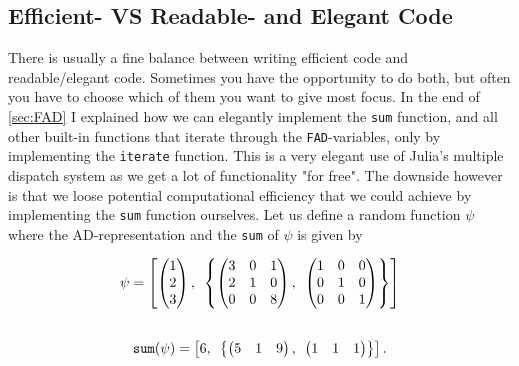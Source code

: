 \subsection{Efficient- VS Readable- and Elegant Code}
There is usually a fine balance between writing efficient code and readable/elegant code. Sometimes you have the opportunity to do both, but often you have to choose which of them you want to give most focus. In the end of \autoref{sec:FAD} I explained how we can elegantly implement the \texttt{sum} function, and all other built-in functions that iterate through the \texttt{FAD}-variables, only by implementing the \texttt{iterate} function. This is a very elegant use of Julia's multiple dispatch system as we get a lot of functionality "for free". The downside however is that we loose potential computational efficiency that we could achieve by implementing the \texttt{sum} function ourselves. Let us define a random function $\psi$ where the AD-representation and the \texttt{sum} of $\psi$ is given by
\begin{multicols}{2}
    \noindent
    \begin{align*}
        \textbf{$\psi$} = \left[\begin{pmatrix}1\\2\\3
        \end{pmatrix},\hspace{0.5em}\left\{
        \begin{pmatrix}
        3&0&1\\
        2&1&0\\
        0&0&8\end{pmatrix},\hspace{0.5em}
        \begin{pmatrix}
        1&0&0\\
        0&1&0\\
        0&0&1\end{pmatrix}\right\}
        \right]
    \end{align*}
    \begin{align*}
    \\
        \texttt{sum}(\textbf{$\psi$}) = \left[6,\hspace{0.5em}
        \left\{
        \begin{pmatrix}
        5&1&9\\
        \end{pmatrix},\hspace{0.5em}
        \begin{pmatrix}
        1&1&1\\
        \end{pmatrix}\right\}
        \right].
    \end{align*}
\end{multicols}
